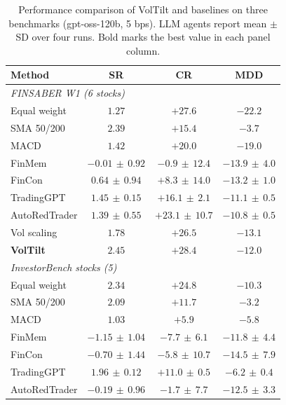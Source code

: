 
\begin{table}[!btp]
\centering
\caption{Performance comparison of VolTilt and baselines on three benchmarks (gpt-oss-120b, 5 bps). LLM agents report mean $\pm$ SD over four runs. Bold marks the best value in each panel column.}
\label{tab:main}
{\small
\setlength{\tabcolsep}{5pt}
\begin{tabular*}{\textwidth}{@{\extracolsep{\fill}}lccc}
\toprule
Method & SR & CR & MDD \\
\midrule
\multicolumn{4}{l}{\textit{FINSABER W1 (6 stocks)}} \\
Equal weight & $1.27$ & $+27.6$ & $-22.2$ \\
SMA 50/200 & $2.39$ & $+15.4$ & $\mathbf{-3.7}$ \\
MACD & $1.42$ & $+20.0$ & $-19.0$ \\
FinMem & $-0.01\,{\pm}\,0.92$ & $-0.9\,{\pm}\,12.4$ & $-13.9\,{\pm}\,4.0$ \\
FinCon & $0.64\,{\pm}\,0.94$ & $+8.3\,{\pm}\,14.0$ & $-13.2\,{\pm}\,1.0$ \\
TradingGPT & $1.45\,{\pm}\,0.15$ & $+16.1\,{\pm}\,2.1$ & $-11.1\,{\pm}\,0.5$ \\
AutoRedTrader & $1.39\,{\pm}\,0.55$ & $+23.1\,{\pm}\,10.7$ & $-10.8\,{\pm}\,0.5$ \\
Vol scaling & $1.78$ & $+26.5$ & $-13.1$ \\
\textbf{VolTilt} & $\mathbf{2.45}$ & $\mathbf{+28.4}$ & $-12.0$ \\
\midrule
\multicolumn{4}{l}{\textit{InvestorBench stocks (5)}} \\
Equal weight & $2.34$ & $+24.8$ & $-10.3$ \\
SMA 50/200 & $2.09$ & $+11.7$ & $\mathbf{-3.2}$ \\
MACD & $1.03$ & $+5.9$ & $-5.8$ \\
FinMem & $-1.15\,{\pm}\,1.04$ & $-7.7\,{\pm}\,6.1$ & $-11.8\,{\pm}\,4.4$ \\
FinCon & $-0.70\,{\pm}\,1.44$ & $-5.8\,{\pm}\,10.7$ & $-14.5\,{\pm}\,7.9$ \\
TradingGPT & $1.96\,{\pm}\,0.12$ & $+11.0\,{\pm}\,0.5$ & $-6.2\,{\pm}\,0.4$ \\
AutoRedTrader & $-0.19\,{\pm}\,0.96$ & $-1.7\,{\pm}\,7.7$ & $-12.5\,{\pm}\,3.3$ \\

\end{tabular*}}
\end{table}
